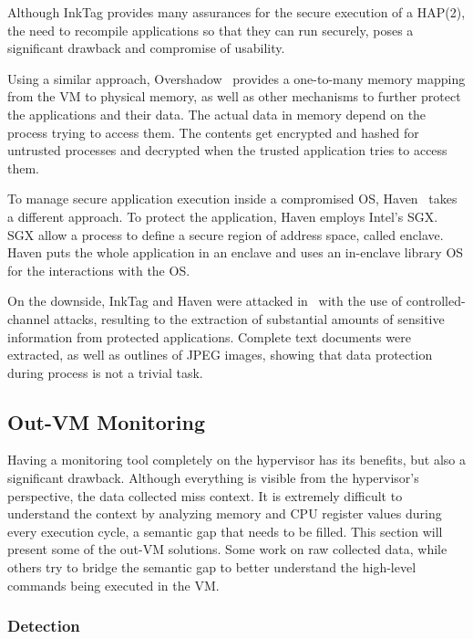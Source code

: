 \par Although InkTag provides many assurances for the secure execution of a \ac{HAP(2)}, the need to recompile applications so that they can run securely, poses a significant drawback and compromise of usability.

\par Using a similar approach, Overshadow~\cite{chen2008overshadow} provides a one-to-many memory mapping from the \ac{VM} to physical memory, as well as other mechanisms to further protect the applications and their data. The actual data in memory depend on the process trying to access them. The contents get encrypted and hashed for untrusted processes and decrypted when the trusted application tries to access them. 

\par To manage secure application execution inside a compromised \ac{OS}, Haven~\cite{baumann2015shielding} takes a different approach. To protect the application, Haven employs Intel's \ac{SGX}. \ac{SGX} allow a process to define a secure region of address space, called enclave. Haven puts the whole application in an enclave and uses an in-enclave library \ac{OS} for the interactions with the \ac{OS}.

\par On the downside, InkTag and Haven were attacked in~\cite{xu2015controlled} with the use of controlled-channel attacks, resulting to the extraction of substantial amounts of sensitive information from protected applications. Complete text documents were extracted, as well as outlines of JPEG images, showing that data protection during process is not a trivial task. 


\subsection{Out-\ac{VM} Monitoring}\label{sub:outvm}
Having a monitoring tool completely on the hypervisor has its benefits, but also a significant drawback. Although everything is visible from the hypervisor's perspective, the data collected miss context. It is extremely difficult to understand the context by analyzing memory and \ac{CPU} register values during every execution cycle, a semantic gap that needs to be filled. This section will present some of the out-\ac{VM} solutions. Some work on raw collected data, while others try to bridge the semantic gap to better understand the high-level commands being executed in the \ac{VM}.

\subsubsection{Detection}

